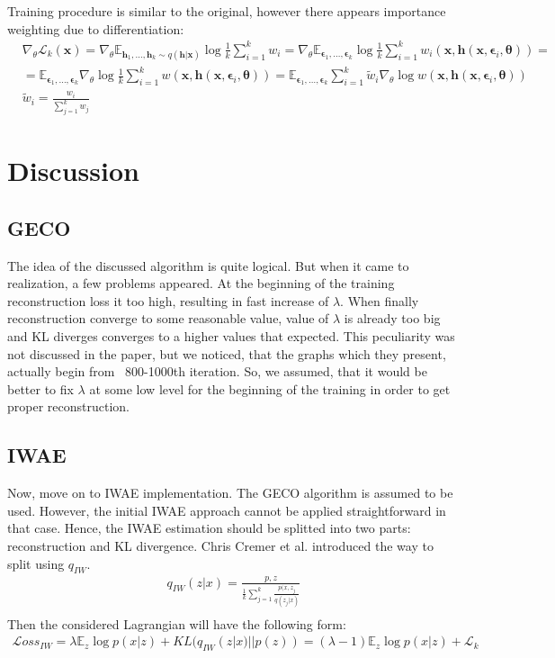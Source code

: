 \documentclass{article}
\begin{document}
Training procedure is similar to the original, however there appears importance weighting due to differentiation:
\begin{align*}
    &\nabla_\theta \mathcal{L}_k(\mathbf{x}) = \nabla_\theta\mathbb{E}_{\mathbf{h}_1, \dots, \mathbf{h}_k \sim q(\mathbf{h}|\mathbf{x})} \log \frac{1}{k} \sum_{i=1}^k w_i = \nabla_\theta\mathbb{E}_{\mathbf{\epsilon}_1, \dots, \mathbf{\epsilon}_k} \log \frac{1}{k} \sum_{i=1}^k w_i(\mathbf{x}, \mathbf{h}(\mathbf{x}, \mathbf{\epsilon}_i, \mathbf{\theta})) =\\&= \mathbb{E}_{\mathbf{\epsilon}_1, \dots, \mathbf{\epsilon}_k} \nabla_\theta \log \frac{1}{k} \sum_{i=1}^k  w(\mathbf{x}, \mathbf{h}(\mathbf{x}, \mathbf{\epsilon}_i, \mathbf{\theta})) = \mathbb{E}_{\mathbf{\epsilon}_1, \dots, \mathbf{\epsilon}_k} \sum_{i=1}^k \tilde{w}_i \nabla_\theta \log   w(\mathbf{x}, \mathbf{h}(\mathbf{x}, \mathbf{\epsilon}_i, \mathbf{\theta}))\\
    &\tilde{w}_i = \frac{w_i}{\sum_{j=1}^k w_j}
\end{align*}

\section{Discussion}
\subsection{GECO}
The idea of the discussed algorithm is quite logical. But when it came to realization, a few problems appeared. At the beginning of the training  reconstruction loss it too high, resulting in fast increase of $\lambda$. When finally reconstruction converge to some reasonable value, value of $\lambda$ is already too big and KL diverges converges to a higher values that expected. This peculiarity was not discussed in the paper, but we noticed, that the graphs which they present, actually begin from ~800-1000th iteration. So, we assumed, that it would be better to fix $\lambda$ at some low level for the beginning of the training in order to get proper reconstruction.


\subsection{IWAE}
Now, move on to IWAE implementation. The GECO algorithm is assumed to be used. However, the initial IWAE approach cannot be applied straightforward in that case. Hence, the IWAE estimation should be splitted into two parts: reconstruction and KL divergence. Chris Cremer et al. introduced the way to split using $q_{IW}$.
\begin{align*}
    q_{IW} (z|x) = \frac{p,z}{\frac{1}{k}\sum_{j=1}^k \frac{p(x,z_j}{q(z_j|x)}}\\
\end{align*}
Then the considered Lagrangian will have the following form:
\begin{align}\label{eq:Loss_iwae}
    \mathcal{L}oss_{IW} = \lambda \mathbb{E}_z \log p(x|z) + KL(q_{IW}(z|x)||p(z)) = (\lambda-1) \mathbb{E}_z \log p(x|z) + \mathcal{L}_{k}
\end{align}
\end{document}
